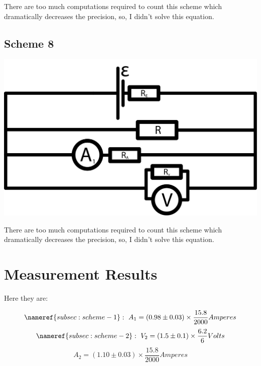 \documentclass[11pt]{memoir}
\newcommand{\initialCurrentDispersion}{0.03}
\newcommand{\initialVoltageDispersion}{0.1}
\newcommand{\voltageConvertingFrac}{\frac{6.2}{6}}
\newcommand{\currentConvertingFrac}{\frac{15.8}{2000}}
\begin{document}
    There are too much computations required to count this scheme which dramatically decreases the precision, so, I didn't solve this equation.

    \newpage

    \subsection{Scheme 8}\label{subsec:scheme-8}
    \includegraphics[width=\linewidth]{../schemes/Scheme8.png}

    There are too much computations required to count this scheme which dramatically decreases the precision, so, I didn't solve this equation.


%
%

    \newpage
    \section{Measurement Results}\label{sec:measurement-results} %

    Here they are:

    \begin{equation*}
        \nameref{subsec:scheme-1}: ~
        A_1 = \left( 0.98 \pm \initialCurrentDispersion \right) \times \currentConvertingFrac Amperes
    \end{equation*}
    \begin{equation*}
        \nameref{subsec:scheme-2}: ~
        V_2 = \left( 1.5 \pm \initialVoltageDispersion \right) \times \voltageConvertingFrac Volts
    \end{equation*}
    \begin{equation*}
        A_2 = \left( 1.10 \pm \initialCurrentDispersion \right) \times \currentConvertingFrac Amperes
    \end{equation*}
\end{document}
